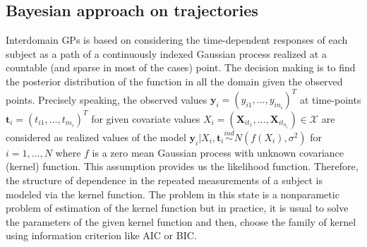 \documentclass[]{article}
\begin{document}
		\subsection{Bayesian approach on trajectories}
		Interdomain GPs is based on considering the time-dependent responses of each subject as a path of a continuously indexed Gaussian process realized at a countable (and sparse in most of the cases) point. The decision making is to find the posterior distribution of the function in all the domain given the observed points. Precisely speaking, the observed values $\mathbf{y}_i=(y_{i1},\ldots,y_{in_i})^T$ at time-points $\mathbf{t}_i=(t_{i1},\ldots,t_{in_i})^T$ for given covariate values $X_i=(\mathbf{X}_{it_1},\ldots,\mathbf{X}_{it_{n_i}})\in\mathcal{X}$ 
		are considered as realized values of the model $\mathbf{y}_i|X_i,\mathbf{t}_i\overset{ind}{\sim}N(f(X_i),\sigma^2)$ for $i=1,\ldots,N$ where $f$ is a zero mean Gaussian process with unknown covariance (kernel) function. This assumption provides us the likelihood function. Therefore, the structure of dependence in the repeated measurements of a subject is modeled via the kernel function. The problem in this state is a nonparametic problem of estimation of the kernel function but in practice, it is usual to solve the parameters of the given kernel function and then, choose the family of kernel using information criterion like AIC or BIC. 
\end{document}
